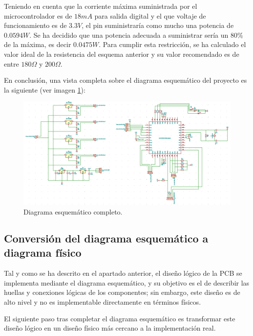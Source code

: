 \begin{itemize}
    Teniendo en cuenta que la corriente máxima suministrada por el microcontrolador es de $18mA$ para salida digital y el que voltaje de funcionamiento es de $3.3V$, el pin suministraría como mucho una potencia de $0.0594W$. Se ha decidido que una potencia adecuada a suministrar sería un 80\% de la máxima, es decir $0.0475W$. Para cumplir esta restricción, se ha calculado el valor ideal de la resistencia del esquema anterior y su valor recomendado es de entre $180 \Omega$ y $200 \Omega$.
    
\end{itemize}

En conclusión, una vista completa sobre el diagrama esquemático del proyecto es la siguiente (ver imagen \ref{fig:Diagrama_Esquematico_Final}): 

    \begin{figure}[H]
    \centering 
    \includegraphics[width=\linewidth]{pictures/EsquematicoCompleto.PNG}
    \caption{Diagrama esquemático completo.}
    \label{fig:Diagrama_Esquematico_Final}
    \end{figure}

\subsection{Conversión del diagrama esquemático a diagrama físico}

Tal y como se ha descrito en el apartado anterior, el diseño lógico de la \ac{PCB} se implementa mediante el diagrama esquemático, y su objetivo es el de describir las huellas y conexiones lógicas de los componentes; sin embargo, este diseño es de alto nivel y no es implementable directamente en términos físicos. 

El siguiente paso tras completar el diagrama esquemático es transformar este diseño lógico en un diseño físico más cercano a la implementación real. 

